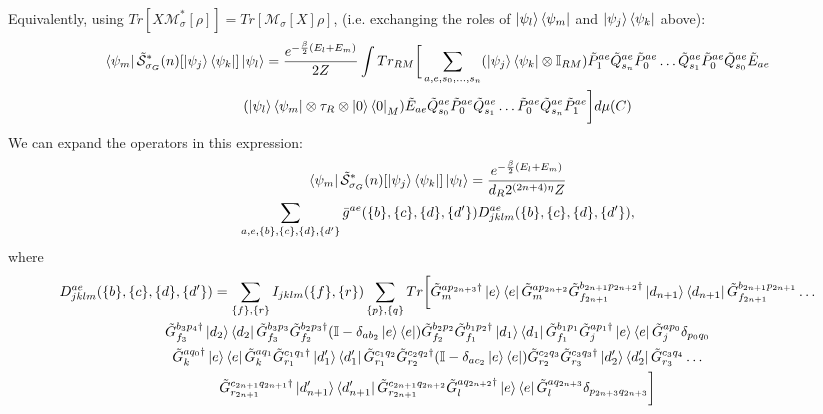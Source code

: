 \documentclass[aps,floatfix,10pt,amssymb,amsfont,amsmath,superscriptaddress,float,nofootinbib,longbibliography,nobalancelastpage,twocolumn]{revtex4-2}
\begin{document}
\begin{widetext}
\begin{multline}
\end{multline}
Equivalently, using $Tr[X\mathcal{M}^*_{\sigma}[\rho]] = Tr[\mathcal{M}_{\sigma}[X]\rho]$, (i.e. exchanging the roles of $\ket{\psi_l}\bra{\psi_m}$ and $\ket{\psi_j}\bra{\psi_k}$ above):
\begin{multline}
       \bra{\psi_m}\tilde{\mathcal{S}}^*_{\sigma_G}(n)[\ket{\psi_j}\bra{\psi_k}]\ket{\psi_l} = \frac{e^{-\frac{\beta}{2}(E_l+E_m)}}{2Z}\int Tr_{RM}\bigg[ \sum_{a,e,s_0,\ldots,s_n}(\ket{\psi_j}\bra{\psi_k}\otimes \mathbb{I}_{RM})\tilde P^{ae}_1\tilde Q^{ae}_{s_n}\tilde P^{ae}_0\ldots\tilde Q^{ae}_{s_1}\tilde P^{ae}_0\tilde Q^{ae}_{s_0}\tilde E_{ae} \\(\ket{\psi_l}\bra{\psi_m}\otimes \tau_R\otimes \ket{0}\bra{0}_M)  \tilde E_{ae}\tilde Q^{ae}_{s_0}\tilde P^{ae}_0\tilde Q^{ae}_{s_1}\ldots\tilde P^{ae}_0\tilde Q^{ae}_{s_n}\tilde P^{ae}_1\bigg]d\mu(C)
    \label{eq:Bstarexpanded}
\end{multline}
We can expand the operators in this expression:
\begin{multline}
    \bra{\psi_m}\tilde{\mathcal{S}}^*_{\sigma_G}(n)[\ket{\psi_j}\bra{\psi_k}]\ket{\psi_l} = \frac{e^{-\frac{\beta}{2}(E_l+E_m)}}{d_R2^{(2n+4)\eta}Z}\\\sum_{a,e,\{b\},\{c\},\{d\},\{d'\}} \bar g^{ae}(\{b\},\{c\},\{d\},\{d'\}) D^{ae}_{jklm}(\{b\},\{c\},\{d\},\{d'\}),
    \label{eq:B*def}
\end{multline}
where 
\begin{multline}
    D^{ae}_{jklm}(\{b\},\{c\},\{d\},\{d'\}) =  \sum_{\{f\}, \{r\}}  I_{jklm}(\{f\},\{r\})
    \sum_{\{p\},\{q\}}
Tr\bigg[\tilde G^{ap_{2n+3}\dagger}_m\ket{e}\bra{e}\tilde G^{ap_{2n+2}}_m\tilde G^{b_{2n+1}p_{2n+2}\dagger}_{f_{2n+1}}\ket{d_{n+1}}\bra{d_{n+1}}\tilde G^{b_{2n+1}p_{2n+1}}_{f_{2n+1}}\ldots\\ \tilde G^{b_3p_4\dagger}_{f_3}\ket{d_2}\bra{d_2}\tilde G^{b_3p_3}_{f_3}\tilde G^{b_2p_3\dagger}_{f_2}(\mathbb{I} - \delta_{ab_2}\ket{e}\bra{e})\tilde G^{b_2p_2}_{f_2}\tilde G^{b_1p_2\dagger}_{f_1}\ket{d_1}\bra{d_1}\tilde G^{b_1p_1}_{f_1}\tilde G^{ap_1\dagger}_j\ket{e}\bra{e}\tilde G^{ap_0}_j\delta_{p_0q_0}\\
\tilde G^{aq_0\dagger}_k\ket{e}\bra{e}\tilde G^{aq_1}_k\tilde G^{c_1q_1\dagger}_{r_1}\ket{d'_1}\bra{d'_1}\tilde G^{c_1q_2}_{r_1}\tilde G^{c_2q_2\dagger}_{r_2}(\mathbb{I} - \delta_{ac_2}\ket{e}\bra{e})\tilde G^{c_2q_3}_{r_2}\tilde G^{c_3q_3\dagger}_{r_3}\ket{d'_2}\bra{d'_2}\tilde G^{c_3q_4}_{r_3}\ldots\\
\tilde G^{c_{2n+1}q_{2n+1}\dagger}_{r_{2n+1}}\ket{d'_{n+1}}\bra{d'_{n+1}}\tilde G^{c_{2n+1}q_{2n+2}}_{r_{2n+1}}\tilde G^{aq_{2n+2}\dagger}_l\ket{e}\bra{e}\tilde G^{aq_{2n+3}}_l \delta_{p_{2n+3}q_{2n+3}}\bigg]

\end{multline}
\end{widetext}
\end{document}
